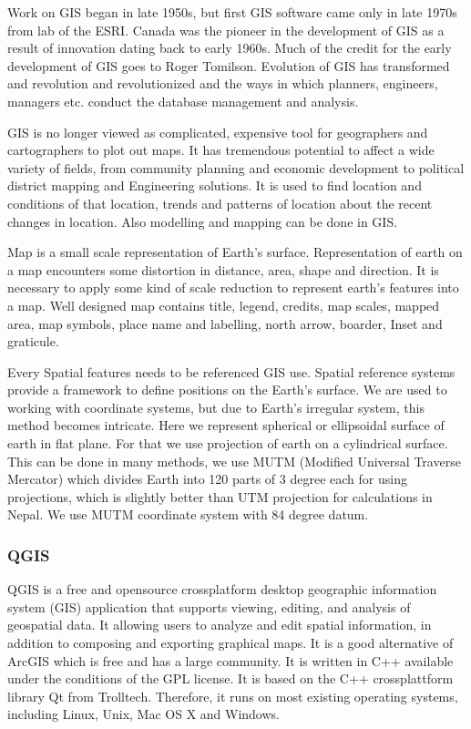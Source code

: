 Work on GIS began in late 1950s, but first GIS software came only in late 1970s from lab of the ESRI. Canada was the pioneer in the development of GIS as a result of innovation dating back to early 1960s. Much of the credit for the early development of GIS goes to Roger Tomilson. Evolution of GIS has transformed and revolution and revolutionized and the ways in which planners, engineers, managers etc. conduct the database management and analysis.

GIS is no longer viewed as complicated, expensive tool for geographers and cartographers to plot out maps. It has tremendous potential to affect a wide variety of fields, from community planning and economic development to political district mapping and Engineering solutions. It is used to find location and conditions of that location, trends and patterns of location about the recent changes in location. Also modelling and mapping can be done in GIS.

Map is a small scale representation of Earth’s surface. Representation of earth on a map encounters some distortion in distance, area, shape and direction. It is necessary to apply some kind of scale reduction to represent earth’s features into a map. Well designed map contains title, legend, credits, map scales, mapped area, map symbols, place name and labelling, north arrow, boarder, Inset and graticule.

Every Spatial features needs to be referenced GIS use. Spatial reference systems provide a framework to define positions on the Earth’s surface. We are used to working with coordinate systems, but due to Earth’s irregular system, this method becomes intricate. Here we represent spherical or ellipsoidal surface of earth in flat plane. For that we use projection of earth on a cylindrical surface. This can be done in many methods, we use MUTM (Modified Universal Traverse Mercator) which divides Earth into 120 parts of 3 degree each for using projections, which is slightly better than UTM projection for calculations in Nepal. We use MUTM coordinate system with 84 degree datum.

\subsubsection{QGIS}
QGIS is a free and open\-source cross\-platform desktop geographic information system (GIS) application that supports viewing, editing, and analysis of geospatial data. It allowing users to analyze and edit spatial information, in addition to composing and exporting graphical maps. It is a good alternative of ArcGIS which is free and has a large community. It is written in C++ available under the conditions of the GPL license. It is based on the C++ crossplattform library Qt from Trolltech. Therefore, it runs on most existing operating systems, including Linux, Unix, Mac OS X and Windows. 

